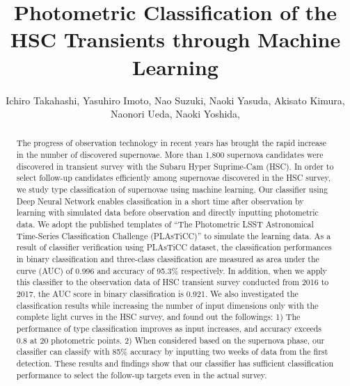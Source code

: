 \documentclass[useamsfonts]{pasj01}
\begin{document}
\title{Photometric Classification of the HSC Transients through Machine Learning}
\author{
Ichiro Takahashi,
Yasuhiro Imoto,
Nao Suzuki,
Naoki Yasuda,
Akisato Kimura,
Naonori Ueda,
Naoki Yoshida,
%
}%



\maketitle
%

\begin{abstract}
The progress of observation technology in recent years has brought the rapid increase in the number of discovered supernovae. More than 1,800 supernova candidates were discovered in transient survey with the Subaru Hyper Suprime-Cam (HSC). In order to select follow-up candidates efficiently among supernovae discovered in the HSC survey, we study type classification of supernovae using machine learning. Our classifier using Deep Neural Network enables classification in a short time after observation by learning with simulated data before observation and directly inputting photometric data. We adopt the published templates of “The Photometric LSST Astronomical Time-Series Classification Challenge (PLAsTiCC)” to simulate the learning data. As a result of classifier verification using PLAsTiCC dataset, the classification performances in binary classification and three-class classification are measured as area under the curve (AUC) of 0.996 and accuracy of 95.3\% respectively. In addition, when we apply this classifier to the observation data of HSC transient survey conducted from 2016 to 2017, the AUC score in binary classification is 0.921. We also investigated the classification results while increasing the number of input dimensions only with the complete light curves in the HSC survey, and found out the followings: 1) The performance of type classification improves as input increases, and accuracy exceeds 0.8 at 20 photometric points. 2) When considered based on the supernova phase, our classifier can classify with 85\% accuracy by inputting two weeks of data from the first detection. These results and findings show that our classifier has sufficient classification performance to select the follow-up targets even in the actual survey.
\end{abstract}
\end{document}

